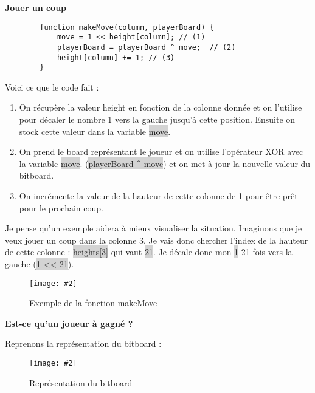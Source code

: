 \documentclass[a4paper]{article}
\newcommand{\img}[3][]{
    \begin{figure}[H]
        \centering
        \texttt{[image: \#2]}
        \caption{#1}    
    \end{figure}
}
\newcommand{\inlinecode}[1]{\colorbox{lightgray}{#1}}
\newcommand{\ptitle}[1]{\vspace{10pt}
{\large \noindent \textbf{#1}}}
\begin{document}
    \ptitle{Jouer un coup}

    \begin{lstlisting}
        function makeMove(column, playerBoard) {
            move = 1 << height[column]; // (1)
            playerBoard = playerBoard ^ move;  // (2)
            height[column] += 1; // (3)
        }
    \end{lstlisting}
    Voici ce que le code fait : 
    \begin{enumerate}
        \item On récupère la valeur height en fonction de la colonne donnée et on l'utilise pour décaler le nombre 1 vers la gauche jusqu'à cette position. Ensuite on stock cette valeur dans la variable \inlinecode{move}.
        \item On prend le board représentant le joueur et on utilise l'opérateur XOR avec la variable \inlinecode{move}. (\inlinecode{playerBoard \^{} move}) et on met à jour la nouvelle valeur du bitboard.
        \item On incrémente la valeur de la hauteur de cette colonne de 1 pour être prêt pour le prochain coup.
    \end{enumerate}

    Je pense qu'un exemple aidera à mieux visualiser la situation. Imaginons que je veux jouer un coup dans la colonne 3. Je vais donc chercher l'index de la hauteur de cette colonne : \inlinecode{heights[3]} qui vaut \inlinecode{21}. Je décale donc mon \inlinecode{1} 21 fois vers la gauche (\inlinecode{1 << 21}).

    \img[Exemple de la fonction makeMove]{Images/ExempleMakeMove.png}{1}

    \ptitle{Est-ce qu'un joueur à gagné ?}

    Reprenons la représentation du bitboard :
    \img[Représentation du bitboard]{Images/BitBoard.png}{0.5}



\end{document}
